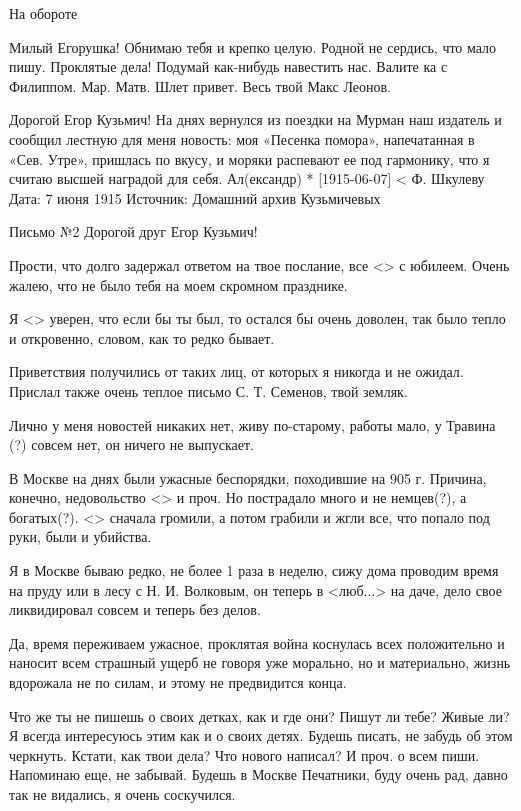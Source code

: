                                                На обороте


Милый Егорушка! Обнимаю тебя и крепко целую. Родной не сердись, что мало пишу. Проклятые дела! Подумай как-нибудь навестить нас. Валите ка с Филиппом.
  Мар. Матв. Шлет привет.
  Весь твой Макс Леонов.

Дорогой Егор Кузьмич!
На днях вернулся из поездки на Мурман наш издатель и сообщил лестную для меня новость: моя «Песенка помора», напечатанная в «Сев. Утре», пришлась по вкусу, и моряки распевают ее под гармонику, что я считаю высшей наградой для себя.
                                              Ал(ександр)
* [1915-06-07] < Ф. Шкулеву 
Дата: 7 июня 1915
Источник: Домашний архив Кузьмичевых

Письмо №2
Дорогой друг
Егор Кузьмич!

Прости, что долго задержал ответом на твое послание, все <> с юбилеем.
Очень жалею, что не было тебя на моем скромном празднике.

Я <> уверен, что если бы ты был, то остался бы очень доволен, так было тепло и откровенно, словом, как то редко бывает.

Приветствия получились от таких лиц, от которых я никогда и не ожидал. Прислал также очень теплое письмо С. Т. Семенов, твой земляк.

Лично у меня новостей никаких нет, живу по-старому, работы мало,  у Травина (?) совсем нет, он ничего не выпускает.

В Москве на днях были ужасные беспорядки, походившие на 905 г. Причина, конечно, недовольство <> и проч. Но пострадало много и не немцев(?), а богатых(?). <> сначала громили, а потом грабили и жгли все, что попало под руки, были и убийства.

Я в Москве бываю редко, не более 1 раза в неделю, сижу дома проводим время на пруду или в лесу с Н. И. Волковым, он теперь в <люб...> на даче, дело свое ликвидировал совсем и теперь без делов.

Да, время переживаем ужасное, проклятая война коснулась всех положительно и наносит всем страшный ущерб не говоря уже морально, но и материально, жизнь вдорожала не по силам, и этому не предвидится конца.

Что же ты не пишешь о своих детках, как и где они? Пишут ли тебе? Живые ли? Я всегда интересуюсь этим как и о своих детях. Будешь писать, не забудь об этом черкнуть. Кстати, как твои дела? Что нового написал? И проч. о всем пиши. Напоминаю еще, не забывай. Будешь в Москве Печатники, буду очень рад, давно так не видались, я очень соскучился.


